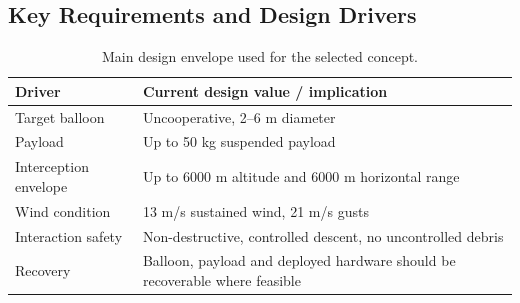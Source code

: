 



\subsection*{Key Requirements and Design Drivers}




\begin{table}[H]
\centering
\small
\caption{Main design envelope used for the selected concept.}
\label{tab:exec_design_envelope}
\renewcommand{\arraystretch}{1.15}
\begin{tabularx}{0.95\textwidth}{@{}p{}X@{}}
\toprule
\textbf{Driver} & \textbf{Current design value / implication} \\
\midrule
Target balloon & Uncooperative, 2--6 m diameter \\
Payload & Up to 50 kg suspended payload \\
Interception envelope & Up to 6000 m altitude and 6000 m horizontal range \\
Wind condition & 13 m/s sustained wind, 21 m/s gusts \\
Interaction safety & Non-destructive, controlled descent, no uncontrolled debris \\
Recovery & Balloon, payload and deployed hardware should be recoverable where feasible \\
\bottomrule
\end{tabularx}
\end{table}

